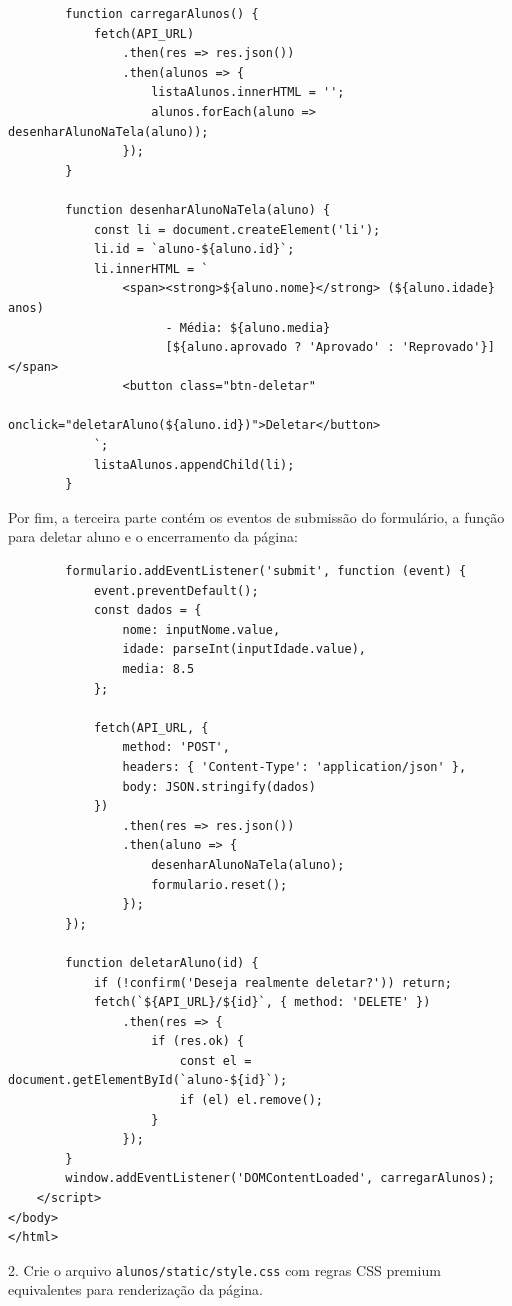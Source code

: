 \documentclass[12pt,a4paper]{article}
\begin{document}
\begin{boxAtividade}
\begin{boxCodigo}
\begin{verbatim}
        function carregarAlunos() {
            fetch(API_URL)
                .then(res => res.json())
                .then(alunos => {
                    listaAlunos.innerHTML = '';
                    alunos.forEach(aluno => desenharAlunoNaTela(aluno));
                });
        }

        function desenharAlunoNaTela(aluno) {
            const li = document.createElement('li');
            li.id = `aluno-${aluno.id}`;
            li.innerHTML = `
                <span><strong>${aluno.nome}</strong> (${aluno.idade} anos) 
                      - Média: ${aluno.media} 
                      [${aluno.aprovado ? 'Aprovado' : 'Reprovado'}]</span>
                <button class="btn-deletar" 
                        onclick="deletarAluno(${aluno.id})">Deletar</button>
            `;
            listaAlunos.appendChild(li);
        }
\end{verbatim}
\end{boxCodigo}

\vspace{0.3cm}
Por fim, a terceira parte contém os eventos de submissão do formulário, a função para deletar aluno e o encerramento da página:
\begin{boxCodigo}
\begin{verbatim}
        formulario.addEventListener('submit', function (event) {
            event.preventDefault();
            const dados = { 
                nome: inputNome.value, 
                idade: parseInt(inputIdade.value), 
                media: 8.5 
            };
            
            fetch(API_URL, {
                method: 'POST',
                headers: { 'Content-Type': 'application/json' },
                body: JSON.stringify(dados)
            })
                .then(res => res.json())
                .then(aluno => {
                    desenharAlunoNaTela(aluno);
                    formulario.reset();
                });
        });

        function deletarAluno(id) {
            if (!confirm('Deseja realmente deletar?')) return;
            fetch(`${API_URL}/${id}`, { method: 'DELETE' })
                .then(res => {
                    if (res.ok) {
                        const el = document.getElementById(`aluno-${id}`);
                        if (el) el.remove();
                    }
                });
        }
        window.addEventListener('DOMContentLoaded', carregarAlunos);
    </script>
</body>
</html>
\end{verbatim}
\end{boxCodigo}

2. Crie o arquivo \texttt{alunos/static/style.css} com regras CSS premium equivalentes para renderização da página.
\end{boxAtividade}
\end{document}
